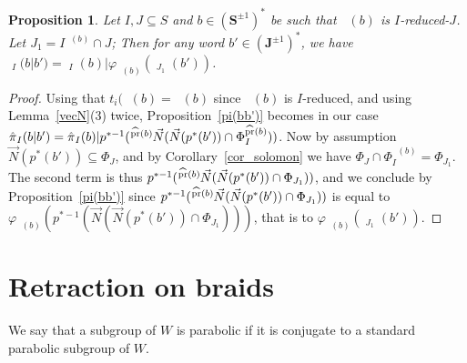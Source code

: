 \documentclass{amsart}
\numberwithin{equation}{section}
\newtheorem{proposition}[equation]{Proposition}
\newcommand\vN{\vec N}
\newcommand\lexp[2]{\kern\scriptspace\vphantom{#2}^{#1}\kern-\scriptspace#2}
\newcommand\bJ{{\mathbf J}}
\newcommand\bS{{\mathbf S}}
\DeclareMathOperator\hpr{\widehat{pr}}
\DeclareMathOperator\hpi{\hat\pi}
\begin{document}
\begin{proposition} \label{pi_I(rb)V2} Let $I,J\subseteq S$ and
$b\in(\bS^{\pm1})^*$ be such that $\hpr(b)$ is  $I$-reduced-$J$.
Let $J_1=I^{\hpr(b)}\cap J$;
Then for any word $b'\in(\bJ^{\pm1})^*$,  we have $\hpi_I(b|b') = 
\hpi_I(b)|\varphi_{\hpr(b)}(\hpi_{J_1}(b'))$.    
\end{proposition} 
\begin{proof}
Using that $t_i(\hpr(b)=\hpr(b)$ since $\hpr(b)$ is $I$-reduced, and using
Lemma~\ref{vecN}(3) twice, Proposition~\ref{pi(bb')} becomes in our case
$\hpi_I(b|b')=\hpi_I(b)|p^{*-1}(\lexp{\hpr(b)}\vN(\vN(p^*(b'))\cap
\Phi_I^{\hpr(b)}))$. Now by assumption $\vN(p^*(b'))\subseteq \Phi_J$, and by
Corollary~\ref{cor_solomon} we have $\Phi_J\cap\Phi_I^{\hpr(b)}=\Phi_{J_1}$.
The second term is thus 
$p^{*-1}(\lexp{\hpr(b)}\vN(\vN(p^*(b'))\cap\Phi_{J_1}))$,
and   we   conclude   by
Proposition~\ref{pi(bb')} since
$p^{*-1}(\lexp{\hpr(b)}\vN(\vN(p^*(b'))\cap\Phi_{J_1}))$   is  equal  to  $
\varphi_{\hpr(b)}(p^{*-1}(\vN(\vN(p^*(b'))\cap\Phi_{J_1})))$,  that  is  to
$\varphi_{\hpr(b)}(\hpi_{J_1}(b'))$.
\end{proof}

\section{Retraction on braids}\label{section2}
We say that a subgroup of $W$ is parabolic if it is conjugate to a standard  
parabolic subgroup of $W$.
\end{document}

